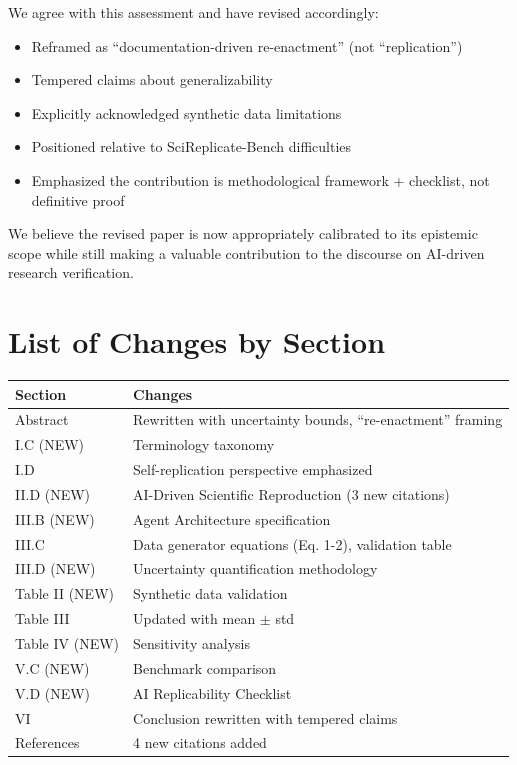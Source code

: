 \documentclass[11pt]{article}
\newcommand{\response}[1]{\textcolor{responsecolor}{#1}}
\begin{document}
\response{We agree with this assessment and have revised accordingly:
\begin{itemize}
    \item Reframed as ``documentation-driven re-enactment'' (not ``replication'')
    \item Tempered claims about generalizability
    \item Explicitly acknowledged synthetic data limitations
    \item Positioned relative to SciReplicate-Bench difficulties
    \item Emphasized the contribution is methodological framework + checklist, not definitive proof
\end{itemize}
We believe the revised paper is now appropriately calibrated to its epistemic scope while still making a valuable contribution to the discourse on AI-driven research verification.
}

\section*{List of Changes by Section}

\begin{table}[h]
\centering
\begin{tabular}{ll}
\toprule
\textbf{Section} & \textbf{Changes} \\
\midrule
Abstract & Rewritten with uncertainty bounds, ``re-enactment'' framing \\
I.C (NEW) & Terminology taxonomy \\
I.D & Self-replication perspective emphasized \\
II.D (NEW) & AI-Driven Scientific Reproduction (3 new citations) \\
III.B (NEW) & Agent Architecture specification \\
III.C & Data generator equations (Eq. 1-2), validation table \\
III.D (NEW) & Uncertainty quantification methodology \\
Table II (NEW) & Synthetic data validation \\
Table III & Updated with mean $\pm$ std \\
Table IV (NEW) & Sensitivity analysis \\
V.C (NEW) & Benchmark comparison \\
V.D (NEW) & AI Replicability Checklist \\
VI & Conclusion rewritten with tempered claims \\
References & 4 new citations added \\
\bottomrule
\end{tabular}
\end{table}
\end{document}
